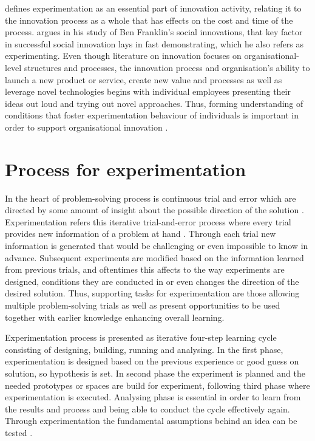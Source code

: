 \citet{thomke1998managing} defines experimentation as an essential part of innovation activity, relating it to the innovation process as a whole that has effects on the cost and time of the process. \citet{mumford2002social} argues in his study of Ben Franklin's social innovations, that key factor in successful social innovation lays in fast demonstrating, which he also refers as experimenting. Even though literature on innovation focuses on organisational-level structures and processes, the innovation process and organisation's ability to launch a new product or service, create new value and processes as well as leverage novel technologies begins with individual employees presenting their ideas out loud and trying out novel approaches. \citep{argote2000knowledge} Thus, forming understanding of conditions that foster experimentation behaviour of individuals is important in order to support organisational innovation \citep{thomke2003r}. 

\section{Process for experimentation}
In the heart of problem-solving process is continuous trial and error which are directed by some amount of insight about the possible direction of the solution \citep{barron200thinking}. Experimentation refers this iterative trial-and-error process where every trial provides new information of a problem at hand \citep{thomke1998modes,thomke1998modes}. Through each trial new information is generated that would be challenging or even impossible to know in advance. Subsequent experiments are modified based on the information learned from previous trials, and oftentimes this affects to the way experiments are designed, conditions they are conducted in or even changes the direction of the desired solution. \citep{thomke1998modes} Thus, supporting tasks for experimentation are those allowing multiple problem-solving trials as well as present opportunities to be used together with earlier knowledge enhancing overall learning. \citep{lee2004mixed}

Experimentation process is presented as iterative four-step learning cycle consisting of designing, building, running and analysing. In the first phase, experimentation is designed based on the previous experience or good guess on solution, so hypothesis is set. In second phase the experiment is planned and the needed prototypes or spaces are build for experiment, following third phase where experimentation is executed. Analysing phase is essential in order to learn from the results and process and being able to conduct the cycle effectively again. \citep{thomke1998managing} Through experimentation the fundamental assumptions behind an idea can be tested \citep{tuulenmaki2011art}.

